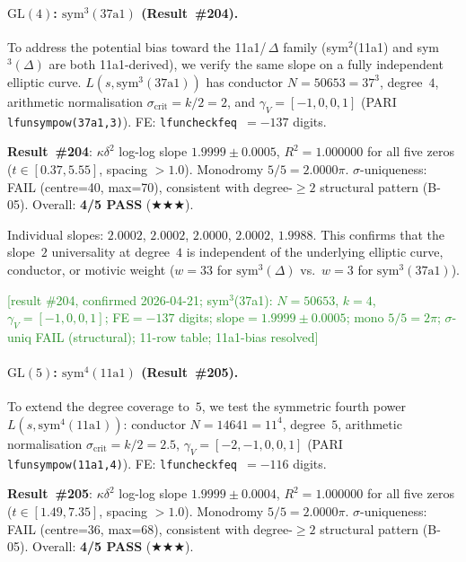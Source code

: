 \documentclass[11pt, a4paper]{article}
\theoremstyle{plain}
\theoremstyle{definition}
\begin{document}
\paragraph{$\mathrm{GL}(4)$: $\mathrm{sym}^{3}(\text{37a1})$
(Result~\#204).}
\label{par:gl4sym3_37a1}
To address the potential bias toward the 11a1/\,$\Delta$ family
(sym$^{2}$(11a1) and sym$^{3}(\Delta)$ are both 11a1-derived), we
verify the same slope on a fully independent elliptic curve.
$L(s,\mathrm{sym}^3(\text{37a1}))$ has conductor $N=50653=37^3$,
degree~$4$, arithmetic normalisation $\sigma_{\mathrm{crit}}=k/2=2$,
and $\gamma_V=[-1,0,0,1]$ (PARI \texttt{lfunsympow(37a1,3)}).
FE: \texttt{lfuncheckfeq}~$=-137$ digits.

\medskip
\noindent\textbf{Result~\#204}: $\kappa\delta^{2}$ log-log slope
$\mathbf{1.9999\pm 0.0005}$, $R^{2}=1.000000$ for all five zeros
($t\in[0.37, 5.55]$, spacing $>1.0$).
Monodromy $5/5=2.0000\pi$.  $\sigma$-uniqueness: FAIL (centre=40,
max=70), consistent with degree-${\geq}2$ structural pattern (B-05).
Overall: \textbf{4/5 PASS} ($\bigstar\bigstar\bigstar$).

Individual slopes: $2.0002$, $2.0002$, $2.0000$, $2.0002$, $1.9988$.
This confirms that the slope~$2$ universality at degree~$4$ is
independent of the underlying elliptic curve, conductor, or motivic
weight ($w=33$ for $\mathrm{sym}^3(\Delta)$ vs.\ $w=3$ for
$\mathrm{sym}^3(\text{37a1})$).

\textcolor{ForestGreen}{[result \#204, confirmed 2026-04-21;
sym$^3$(37a1): $N{=}50653$, $k{=}4$, $\gamma_V{=}[-1,0,0,1]$;
FE${=}-137$ digits; slope${=}1.9999{\pm}0.0005$; mono $5/5{=}2\pi$;
$\sigma$-uniq FAIL (structural); 11-row table; 11a1-bias resolved]}


\paragraph{$\mathrm{GL}(5)$: $\mathrm{sym}^{4}(\text{11a1})$
(Result~\#205).}
\label{par:gl5sym4}
To extend the degree coverage to~$5$, we test the symmetric fourth
power $L(s,\mathrm{sym}^4(\text{11a1}))$: conductor $N=14641=11^4$,
degree~$5$, arithmetic normalisation $\sigma_{\mathrm{crit}}=k/2=2.5$,
$\gamma_V=[-2,-1,0,0,1]$ (PARI \texttt{lfunsympow(11a1,4)}).
FE: \texttt{lfuncheckfeq}~$=-116$ digits.

\medskip
\noindent\textbf{Result~\#205}: $\kappa\delta^{2}$ log-log slope
$\mathbf{1.9999\pm 0.0004}$, $R^{2}=1.000000$ for all five zeros
($t\in[1.49, 7.35]$, spacing $>1.0$).
Monodromy $5/5=2.0000\pi$.  $\sigma$-uniqueness: FAIL (centre=36,
max=68), consistent with degree-${\geq}2$ structural pattern (B-05).
Overall: \textbf{4/5 PASS} ($\bigstar\bigstar\bigstar$).
\end{document}
